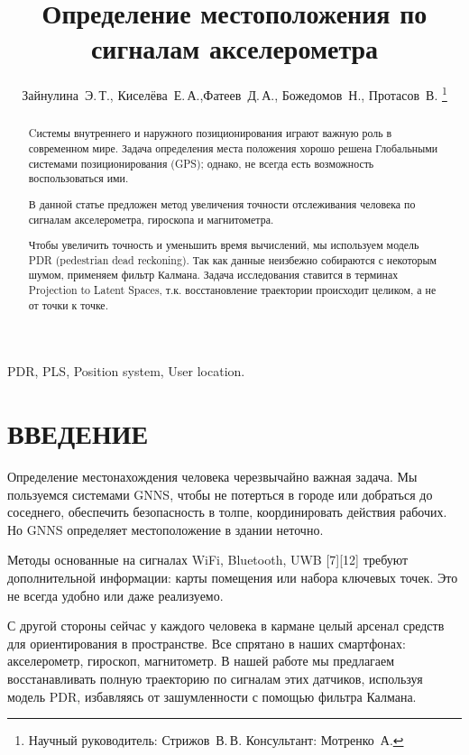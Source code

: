 \documentclass[letterpaper, 10 pt, conference]{ieeeconf}  %
\title{\LARGE \bf
Определение местоположения по сигналам акселерометра
}
\author{Зайнулина~Э.\,Т., Киселёва~Е.\,А.,Фатеев~Д.\,А.,
    Божедомов~Н.,
    Протасов~В.%
\thanks
    {
   Научный руководитель:  Стрижов~В.\,В.
    Консультант:  Мотренко~А.}
    }
\begin{document}
\maketitle
\thispagestyle{empty}
\pagestyle{empty}


\begin{abstract}
Cистемы внутреннего и наружного позиционирования играют важную роль в современном мире. Задача определения места положения хорошо решена Глобальными системами позиционирования (GPS); однако, не всегда есть возможность воспользоваться ими.

В данной статье предложен метод увеличения точности отслеживания человека по сигналам акселерометра, гироскопа и магнитометра.

Чтобы увеличить точность и уменьшить время вычислений, мы используем модель PDR (pedestrian dead reckoning). Так как данные неизбежно собираются с некоторым шумом, применяем фильтр Калмана. Задача исследования ставится в терминах Projection to Latent Spaces, т.к. восстановление траектории происходит целиком, а не от точки к точке.
\end{abstract}
\begin{keywords}
PDR, PLS, Position system, User location.
\end{keywords}

\section{ВВЕДЕНИЕ}
Определение местонахождения человека черезвычайно важная задача. Мы пользуемся системами GNNS, чтобы не потерться в городе или добраться до соседнего, обеспечить безопасность в толпе, координировать действия рабочих. Но GNNS определяет местоположение в здании неточно.

Методы основанные на сигналах WiFi, Bluetooth, UWB [7][12] требуют дополнительной информации: карты помещения или набора ключевых точек. Это не всегда удобно или даже реализуемо.

С другой стороны сейчас у каждого человека в кармане целый арсенал средств для ориентирования в пространстве. Все спрятано в наших смартфонах: акселерометр, гироскоп, магнитометр. В нашей работе мы предлагаем восстанавливать полную траекторию по сигналам этих датчиков, используя модель PDR, избавляясь от зашумленности с помощью фильтра Калмана.
\end{document}
